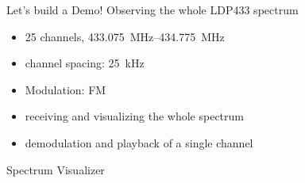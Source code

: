 \documentclass{beamer}
\begin{document}
\begin{frame}{Let's build a Demo!}
Observing the whole LDP433 spectrum
\begin{itemize}
  \item 25 channels, \SIrange{433.075}{434.775}{\mega\hertz}
  \item channel spacing: \SI{25}{\kilo\hertz}
  \item Modulation: FM
  \item receiving and visualizing the whole spectrum
  \item demodulation and playback of a single channel
\end{itemize}
\end{frame}
\begin{frame}{Spectrum Visualizer}
\end{frame}
\end{document}
